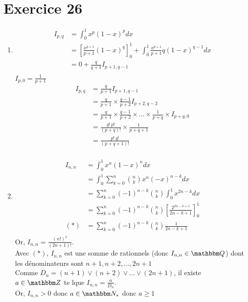 \part{Exercice 26}
\begin{enumerate}
	\item 
		\begin{align*}
			I_{p,q} &= \int_{0}^{1} x^p(1-x)^p dx\\
			&= \left[ \frac{x^{p+1}}{p+1} (1-x)^{q} \right]_0^1+ \int_{0}^{1} \frac{x^{p+1}}{p+1} q(1-x)^{q-1} dx  \\
			&= 0 + \frac{q}{q+1} I_{p+1,q-1} \\
		\end{align*}
		$I_{p,0} = \frac{1}{p+1}$\\
		\begin{align*}
			I_{p,q} &= \frac{q}{p+1}I_{p+1,q-1} \\
			&= \frac{q}{p+1}\times \frac{q-1}{p+2}I_{p+2,q-2} \\
			&= \frac{q}{p+1}\times \frac{q-1}{p+2}\times \ldots \times \frac{1}{p+q}\times I_{p+q,0} \\
			&= \frac{q!~p!}{(p+q)!} \times  \frac{1}{p+q+1} \\
			&= \frac{p!~q!}{(p+q+1)!} \\
		\end{align*}
	\item 
		\begin{align*}
			I_{n,n} &= \int_{0}^{1} x^n(1-x)^n dx\\ 
			&= \int_{0}^{1} \sum_{k=0}^{n} {n \choose k} x^n(-x)^{n-k}dx \\
			&= \sum_{k=0}^{n} (-1)^{n-k} {n \choose k} \int_{0}^{1} x^{2n-k}dx  \\
			&= \sum_{k=0}^{n} (-1)^{n-k} {n \choose k} \left[ \frac{2^{2n-k+1}}{2n-k+1} \right] _0^1 \\
			(*) &= \sum_{k=0}^{n} (-1)^{n-k} {n \choose k} \frac{1}{2n-k+1} \\
		\end{align*}
		Or, $I_{n,n} = \frac{\left( n! \right) ^2}{\left( 2n+1 \right)!}$.\\
		Avec $(*)$, $I_{n,n}$ est une somme de rationnels (donc $I_{n,n} \in \Q$) dont les dénominateurs sont $n+1, n+2, \ldots, 2n+1$ \\
		Comme $D_n = (n+1)\vee(n+2)\vee\ldots\vee(2n+1)$, il existe $a \in \Z$ te lque $I_{n,n}= \frac{a}{D_n}$.\\
		Or, $I_{n,n} >0$ donc $a \in \N_*$ donc $a \ge 1$
		\begin{align*}

\end{align*}
\end{enumerate}
